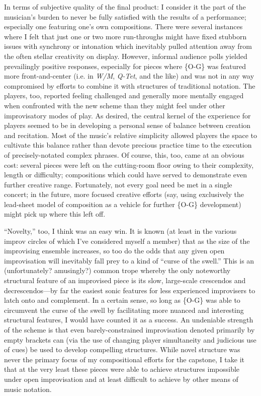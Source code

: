     In terms of subjective quality of the final product: I consider it the part of the musician's burden to never be fully satisfied with the results of a performance; especially one featuring one's own compositions. There were several instances where I felt that just one or two more run-throughs might have fixed stubborn issues with synchrony or intonation which inevitably pulled attention away from the often stellar creativity on display. However, informal audience polls yielded prevailingly positive responses, especially for pieces where \{O-G\} was featured more front-and-center (i.e. in \textit{W/M}, \textit{Q-Tet}, and the like) and was not in any way compromised by efforts to combine it with structures of traditional notation. The players, too, reported feeling challenged and generally more mentally engaged when confronted with the new scheme than they might feel under other improvisatory modes of play. As desired, the central kernel of the experience for players seemed to be in developing a personal sense of balance between creation and recitation. Most of the music's relative simplicity allowed players the space to cultivate this balance rather than devote precious practice time to the execution of precisely-notated complex phrases. Of course, this, too, came at an obvious cost: several pieces were left on the cutting-room floor owing to their complexity, length or difficulty; compositions which could have served to demonstrate even further creative range. Fortunately, not every goal need be met in a single concert; in the future, more focused creative efforts (say, using exclusively the lead-sheet model of composition as a vehicle for further \{O-G\} development) might pick up where this left off.

    ``Novelty,'' too, I think was an easy win. It is known (at least in the various improv circles of which I've considered myself a member) that as the size of the improvising ensemble increases, so too do the odds that any given open improvisation will inevitably fall prey to a kind of ``curse of the swell.'' This is an (unfortunately? amusingly?) common trope whereby the only noteworthy structural feature of an improvised piece is its slow, large-scale crescendos and decrescendos---by far the easiest sonic features for less experienced improvisers to latch onto and complement. In a certain sense, so long as \{O-G\} was able to circumvent the curse of the swell by facilitating more nuanced and interesting structural features, I would have counted it as a success. An undeniable strength of the scheme is that even barely-constrained improvisation denoted primarily by empty brackets can (via the use of changing player simultaneity and judicious use of cues) be used to develop compelling structures. While novel structure was never the primary focus of my compositional efforts for the capstone, I take it that at the very least these pieces were able to achieve structures impossible under open improvisation and at least difficult to achieve by other means of music notation.

